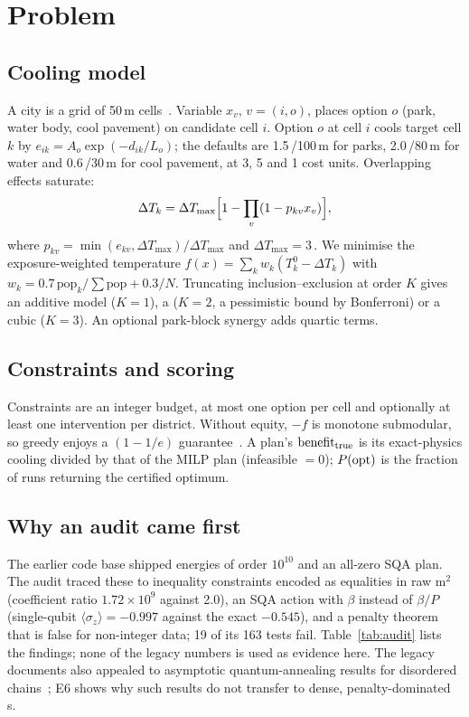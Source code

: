 \documentclass[conference]{IEEEtran}
\begin{document}
\section{Problem}\label{sec:problem}
\subsection{Cooling model}
A city is a grid of 50\,m cells~\cite{zhou2023}. Variable $x_v$, $v=(i,o)$, places option $o$
(park, water body, cool pavement) on candidate cell $i$. Option $o$ at cell $i$ cools target cell
$k$ by $e_{ik}=A_o\exp(-d_{ik}/L_o)$; the defaults are 1.5\,\degC{}/100\,m for parks,
2.0\,\degC{}/80\,m for water and 0.6\,\degC{}/30\,m for cool pavement, at 3, 5 and 1 cost units.
Overlapping effects saturate:
\begin{equation}
\Delta T_k=\Delta T_{\max}\Bigl[1-\prod_v(1-p_{kv}x_v)\Bigr],
\label{eq:sat}
\end{equation}
where $p_{kv}=\min(e_{kv},\Delta T_{\max})/\Delta T_{\max}$
and $\Delta T_{\max}=3$\,\degC{}. We minimise the exposure-weighted temperature
$f(x)=\sum_k w_k(T^0_k-\Delta T_k)$ with $w_k=0.7\,\mathrm{pop}_k/\sum\mathrm{pop}+0.3/N$.
Truncating inclusion--exclusion at order $K$ gives an additive model ($K{=}1$), a \QUBO{} ($K{=}2$,
a pessimistic bound by Bonferroni) or a cubic \HUBO{} ($K{=}3$). An optional park-block synergy
adds quartic terms.

\subsection{Constraints and scoring}
Constraints are an integer budget, at most one option per cell and optionally at least one
intervention per district. Without equity, $-f$ is monotone submodular, so greedy enjoys a
$(1-1/e)$ guarantee~\cite{nemhauser1978}. A plan's $\mathrm{benefit}_{\mathrm{true}}$ is its exact-physics cooling divided by
that of the MILP plan (infeasible $=0$); $P(\mathrm{opt})$ is the fraction of runs returning the certified
optimum.

\subsection{Why an audit came first}
The earlier code base shipped energies of order $10^{10}$ and an all-zero SQA plan. The audit traced
these to inequality constraints encoded as equalities in raw m$^2$ (coefficient ratio
$1.72\times10^{9}$ against 2.0), an SQA action with $\beta$ instead of $\beta/P$ (single-qubit
$\langle\sigma_z\rangle=-0.997$ against the exact $-0.545$), and a penalty theorem that is false for
non-integer data; 19 of its 163 tests fail. Table~\ref{tab:audit} lists the findings; none of the
legacy numbers is used as evidence here. The legacy documents also appealed to asymptotic
quantum-annealing results for disordered chains~\cite{santoro2002}; E6 shows why such results do not
transfer to dense, penalty-dominated \QUBO{}s.
\end{document}
